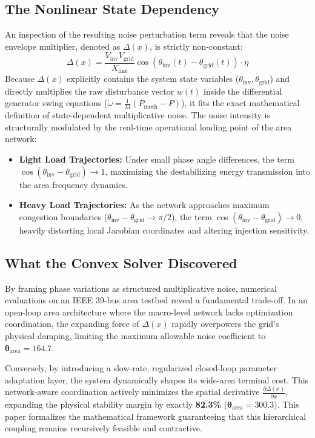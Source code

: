 \documentclass[10pt,journal,compsoc]{IEEEtran}
\begin{document}
\subsection{The Nonlinear State Dependency}
An inspection of the resulting noise perturbation term reveals that the noise envelope multiplier, denoted as $\Delta(x)$, is strictly non-constant:
\begin{equation}
    \Delta(x) = \frac{V_{\text{inv}}V_{\text{grid}}}{X_{\text{line}}}\cos\left(\theta_{\text{inv}}(t) - \theta_{\text{grid}}(t)\right)\cdot \eta
\end{equation}
Because $\Delta(x)$ explicitly contains the system state variables ($\theta_{\text{inv}}, \theta_{\text{grid}}$) and directly multiplies the raw disturbance vector $w(t)$ inside the differential generator swing equations ($\dot{\omega} = \frac{1}{M}(P_{\text{mech}} - P)$), it fits the exact mathematical definition of state-dependent multiplicative noise. The noise intensity is structurally modulated by the real-time operational loading point of the area network:
\begin{itemize}
    \item \textbf{Light Load Trajectories:} Under small phase angle differences, the term $\cos(\theta_{\text{inv}} - \theta_{\text{grid}}) \rightarrow 1$, maximizing the destabilizing energy transmission into the area frequency dynamics.
    \item \textbf{Heavy Load Trajectories:} As the network approaches maximum congestion boundaries ($\theta_{\text{inv}} - \theta_{\text{grid}} \rightarrow \pi/2$), the term $\cos(\theta_{\text{inv}} - \theta_{\text{grid}}) \rightarrow 0$, heavily distorting local Jacobian coordinates and altering injection sensitivity.
\end{itemize}

\subsection{What the Convex Solver Discovered}
By framing phase variations as structured multiplicative noise, numerical evaluations on an IEEE 39-bus area testbed reveal a fundamental trade-off. In an open-loop area architecture where the macro-level network lacks optimization coordination, the expanding force of $\Delta(x)$ rapidly overpowers the grid's physical damping, limiting the maximum allowable noise coefficient to $\bm{\theta}_{\text{area}} = 164.7$. 

Conversely, by introducing a slow-rate, regularized closed-loop parameter adaptation layer, the system dynamically shapes its wide-area terminal cost. This network-aware coordination actively minimizes the spatial derivative $\frac{\partial \Delta(x)}{\partial x}$, expanding the physical stability margin by exactly \textbf{82.3\%} ($\bm{\theta}_{\text{area}} = 300.3$). This paper formalizes the mathematical framework guaranteeing that this hierarchical coupling remains recursively feasible and contractive.
\end{document}
